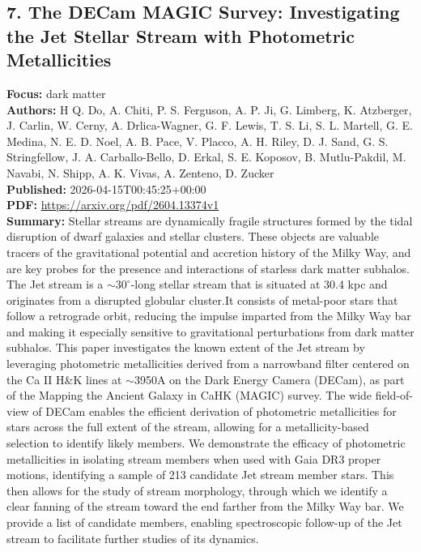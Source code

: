 \documentclass[11pt]{article}
\begin{document}
\subsection*{7. The DECam MAGIC Survey: Investigating the Jet Stellar Stream with Photometric Metallicities}
\textbf{Focus:} dark matter\\
\textbf{Authors:} H Q. Do, A. Chiti, P. S. Ferguson, A. P. Ji, G. Limberg, K. Atzberger, J. Carlin, W. Cerny, A. Drlica-Wagner, G. F. Lewis, T. S. Li, S. L. Martell, G. E. Medina, N. E. D. Noel, A. B. Pace, V. Placco, A. H. Riley, D. J. Sand, G. S. Stringfellow, J. A. Carballo-Bello, D. Erkal, S. E. Koposov, B. Mutlu-Pakdil, M. Navabi, N. Shipp, A. K. Vivas, A. Zenteno, D. Zucker\\
\textbf{Published:} 2026-04-15T00:45:25+00:00\\
\textbf{PDF:} \href{https://arxiv.org/pdf/2604.13374v1}{https://arxiv.org/pdf/2604.13374v1}\\
\textbf{Summary:}
Stellar streams are dynamically fragile structures formed by the tidal disruption of dwarf galaxies and stellar clusters. These objects are valuable tracers of the gravitational potential and accretion history of the Milky Way, and are key probes for the presence and interactions of starless dark matter subhalos. The Jet stream is a $\sim 30^\circ$-long stellar stream that is situated at 30.4 kpc and originates from a disrupted globular cluster.It consists of metal-poor stars that follow a retrograde orbit, reducing the impulse imparted from the Milky Way bar and making it especially sensitive to gravitational perturbations from dark matter subhalos. This paper investigates the known extent of the Jet stream by leveraging photometric metallicities derived from a narrowband filter centered on the Ca II H\&K lines at $\sim$3950A on the Dark Energy Camera (DECam), as part of the Mapping the Ancient Galaxy in CaHK (MAGIC) survey. The wide field-of-view of DECam enables the efficient derivation of photometric metallicities for stars across the full extent of the stream, allowing for a metallicity-based selection to identify likely members. We demonstrate the efficacy of photometric metallicities in isolating stream members when used with Gaia DR3 proper motions, identifying a sample of 213 candidate Jet stream member stars. This then allows for the study of stream morphology, through which we identify a clear fanning of the stream toward the end farther from the Milky Way bar. We provide a list of candidate members, enabling spectroscopic follow-up of the Jet stream to facilitate further studies of its dynamics.
\end{document}
